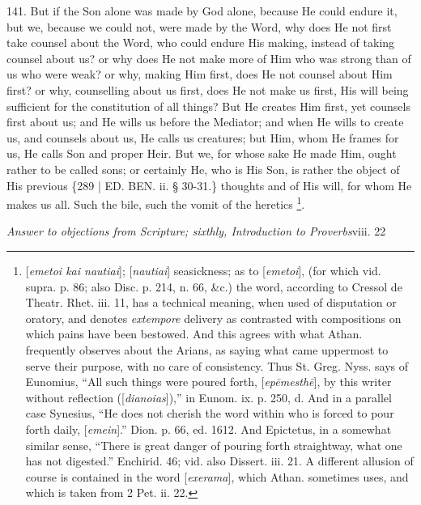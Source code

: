 141. But if the Son alone was
made by God alone, because He could endure it, but we, because we
could not, were made by the Word, why does He not first take counsel
about the Word, who could endure His making, instead of taking counsel
about us? or why does He not make more of Him who was strong than of
us who were weak? or why, making Him first, does He not counsel about
Him first? or why, counselling about us first, does He not make us
first, His will being sufficient for the constitution of all things?
But He creates Him first, yet counsels first about us; and He wills us
before the Mediator; and when He wills to create us, and counsels
about us, He calls us creatures; but Him, whom He frames for us, He
calls Son and proper Heir. But we, for whose sake He made Him, ought
rather to be called sons; or certainly He, who is His Son, is rather
the object of His previous \{289 | ED.
BEN. ii. § 30-31.\} thoughts and of His will, for
whom He makes us all. Such the bile, such the vomit of the heretics \footnote{[\emph{emetoi kai nautiai}]; [\emph{nautiai}] seasickness; as to [\emph{emetoi}],
(for which vid. supra. p. 86; also Disc. p. 214, n. 66, \&c.) the
word, according to Cressol de Theatr. Rhet. iii. 11, has a technical
meaning, when used of disputation or oratory, and denotes \emph{extempore}
delivery as contrasted with compositions on which pains have been
bestowed. And this agrees with what Athan. frequently observes about
the Arians, as saying what came uppermost to serve their purpose, with
no care of consistency. Thus St. Greg. Nyss. says of Eunomius, ``All
such things were poured forth, [\emph{ep\={e}mesth\={e}}], by
this writer without reflection ([\emph{dianoias}]),'' in Eunom. ix. p.
250, d. And in a parallel case Synesius, ``He does not cherish the word
within who is forced to pour forth daily, [\emph{emein}].'' Dion. p.
66, ed. 1612. And Epictetus, in a somewhat similar sense, ``There is
great danger of pouring forth straightway, what one has not digested.''
Enchirid. 46; vid. also Dissert. iii. 21. A different allusion of
course is contained in the word [\emph{exerama}], which Athan.
sometimes uses, and which is taken from 2 Pet. ii. 22.}.


\emph{Answer
to objections from Scripture; sixthly, Introduction to Proverbs}viii.
22

